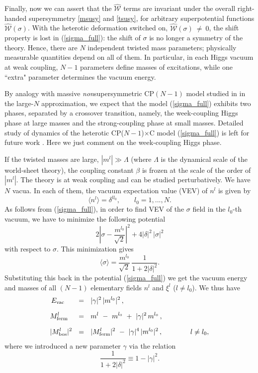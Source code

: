 \documentclass[12pt]{article}
\def\beq{\begin{equation}}
\def\eeq{\end{equation}}
\newcommand{\mc}[1]{\mathcal{#1}}
\newcommand{\CPC}{CP($N-1$)$\times$C }
\begin{document}
	Finally, now we can assert that the $ \hat{\mc{W}} $ terms are invariant under the overall
	right-handed supersymmetry \eqref{msusy} and \eqref{tsusy}, for  arbitrary 
	superpotential functions $ \hat{\mc{W}}(\sigma) $.
	With the heterotic deformation switched on, $ \hat{\mc{W}}(\sigma) ~\neq~ 0 $,
the shift property is lost in (\ref{sigma_full}):
the shift of $ \sigma $ is no longer a symmetry of the theory. Hence,
there are $ N $ independent twisted mass parameters; physically measurable
quantities depend on
 all of them. 
	In particular, in each Higgs vacuum at weak coupling, $ N - 1 $ parameters define masses of excitations, while one ``extra" parameter determines
	the vacuum energy.



By analogy with massive {\em non}supersymmetric CP$(N-1)$ model
studied in \cite{GSYphtr} in the large-$N$ approximation, we expect
that the model (\ref{sigma_full}) exhibits  two phases, 
separated by a crossover transition,
namely, the week-coupling Higgs phase at large masses and 
the strong-coupling phase at small masses. Detailed study of dynamics
of the heterotic \CPC model (\ref{sigma_full}) is left for future work
\cite{BSY5}. Here we just comment on the week-coupling Higgs phase.

If the twisted masses are large, $|m^l|\gg \Lambda$ (where $\Lambda$ is
the dynamical  scale of the world-sheet theory), the coupling constant
$\beta$ is frozen at the scale of the order of $|m^l|$.
The theory is at weak coupling   and can be studied
perturbatively. We have $N$ vacua. In   each of them,  the vacuum expectation value (VEV) of
$n^l$ is given by
\beq
\langle n^l \rangle =\delta^{ll_0}, \qquad l_0=1,...,N.
\label{higgsn}
\eeq
As follows from (\ref{sigma_full}), in order to find VEV of  the $\sigma$ 
field in the $l_0$-th vacuum, we have to minimize the following potential
\beq
2\left|\sigma -\frac{m^{l_0}}{\sqrt{2}}\right|^2 
+4|\delta|^2\,|\sigma|^2
\label{sigmapot}
\eeq
with respect to $\sigma$.
This minimization gives
\beq
\langle \sigma \rangle = \frac{m^{l_0}}{\sqrt{2}}\,
\frac{1}{1+2|\delta|^2}.
\label{higgssigma}
\eeq
Substituting this back in the potential (\ref{sigma_full})
we get the vacuum energy and masses of all $(N-1)$
elementary fields $n^l$ and $\xi^l$ ($l\neq l_0$). We thus have
\begin{align}
%
\notag
	E_\text{vac}~~\;\, & ~~=~~ |\gamma|^2\, |m^{l_0}|^2 \,,
	\\[2mm]
%
\label{hetmass}
	M_\text{ferm}^l\;\,\, & ~~=~~ m^l ~-~ m^{l_0} ~+~ |\gamma|^2\,m^{l_0} \,,
	\\[2mm]
%
\notag
	| M_\text{bos}^l |^2 & ~~=~~ | M_\text{ferm}^l |^2 ~-~ |\gamma|^4\, |m^{l_0}|^2\,,
	\qquad\qquad
	l\neq l_0,
\end{align}
where we introduced a new parameter $\gamma$ via the relation
\beq
\frac{1}{1+2|\delta|^2}\equiv 1-|\gamma|^2.
\label{gammadelta}
\eeq
\end{document}
